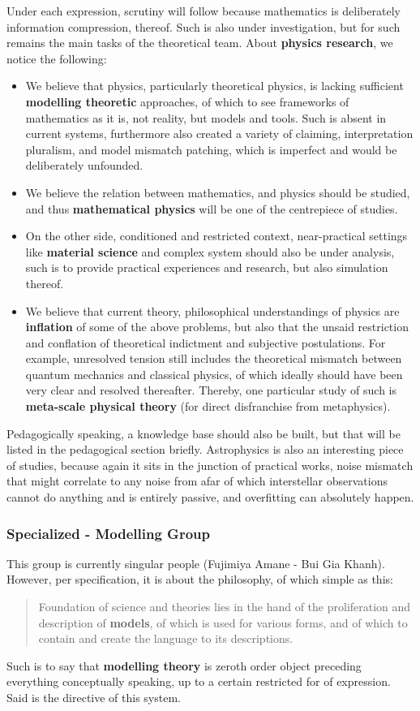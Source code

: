 \documentclass[9pt,a4paper]{article}
\begin{document}
Under each expression, scrutiny will follow because mathematics is deliberately information compression, thereof. Such is also under investigation, but for such remains the main tasks of the theoretical team. About \textbf{physics research}, we notice the following:
\begin{itemize}
    \item We believe that physics, particularly theoretical physics, is lacking sufficient \textbf{modelling theoretic} approaches, of which to see frameworks of mathematics as it is, not reality, but models and tools. Such is absent in current systems, furthermore also created a variety of claiming, interpretation pluralism, and model mismatch patching, which is imperfect and would be deliberately unfounded. 
    \item We believe the relation between mathematics, and physics should be studied, and thus \textbf{mathematical physics} will be one of the centrepiece of studies. 
    \item On the other side, conditioned and restricted context, near-practical settings like \textbf{material science} and complex system should also be under analysis, such is to provide practical experiences and research, but also simulation thereof. 
    \item We believe that current theory, philosophical understandings of physics are \textbf{inflation} of some of the above problems, but also that the unsaid restriction and conflation of theoretical indictment and subjective postulations. For example, unresolved tension still includes the theoretical mismatch between quantum mechanics and classical physics, of which ideally should have been very clear and resolved thereafter. Thereby, one particular study of such is \textbf{meta-scale physical theory} (for direct disfranchise from metaphysics). 
\end{itemize}
Pedagogically speaking, a knowledge base should also be built, but that will be listed in the pedagogical section briefly. Astrophysics is also an interesting piece of studies, because again it sits in the junction of practical works, noise mismatch that might correlate to any noise from afar of which interstellar observations cannot do anything and is entirely passive, and overfitting can absolutely happen. 
\subsubsection{Specialized - Modelling Group}

This group is currently singular people (Fujimiya Amane - Bui Gia Khanh). However, per specification, it is about the philosophy, of which simple as this:
\begin{quote}
    Foundation of science and theories lies in the hand of the proliferation and description of \textbf{models}, of which is used for various forms, and of which to contain and create the language to its descriptions.
\end{quote}
Such is to say that \textbf{modelling theory} is zeroth order object preceding everything conceptually speaking, up to a certain restricted for of expression. Said is the directive of this system. 
\end{document}
